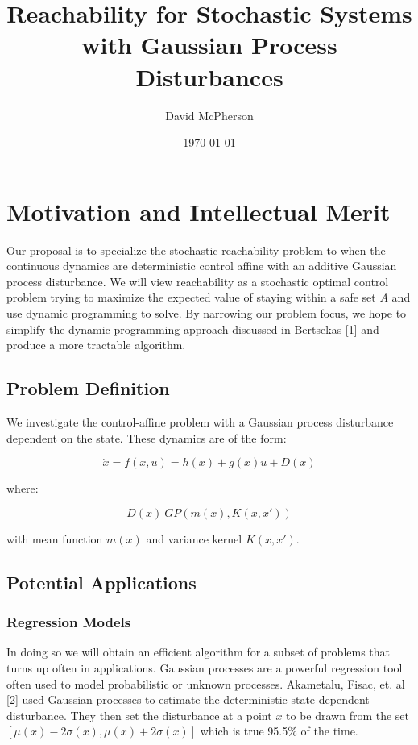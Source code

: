 \documentclass[a4paper]{article}
\title{Reachability for Stochastic Systems with Gaussian Process Disturbances}
\author{David McPherson}
\date{\today}
\begin{document}
\maketitle

\section{Motivation and Intellectual Merit}
Our proposal is to specialize the stochastic reachability problem to when the continuous dynamics are deterministic control affine with an additive Gaussian process disturbance.
We will view reachability as a stochastic optimal control problem trying to maximize the expected value of staying within a safe set $A$ and use dynamic programming to solve.
By narrowing our problem focus, we hope to simplify the dynamic programming approach discussed in Bertsekas [1] and produce a more tractable algorithm.

\subsection{Problem Definition}
We investigate the control-affine problem with a Gaussian process disturbance dependent on the state. These dynamics are of the form:

\begin{equation}
\dot{x} = f(x,u) = h(x) + g(x) u + D(x)
\end{equation}

where:

\begin{equation}
D(x) ~ GP(m(x),K(x,x'))
\end{equation}

with mean function $m(x)$ and variance kernel $K(x,x')$.

\subsection{Potential Applications}
\subsubsection{Regression Models}
In doing so we will obtain an efficient algorithm for a subset of problems that turns up often in applications. Gaussian processes are a powerful regression tool often used to model probabilistic or unknown processes. Akametalu, Fisac, et. al [2] used Gaussian processes to estimate the deterministic state-dependent disturbance. They then set the disturbance at a point $x$ to be drawn from the set $[\mu(x)-2\sigma(x) , \mu(x)+2\sigma(x)]$ which is true 95.5\% of the time.
\end{document}
